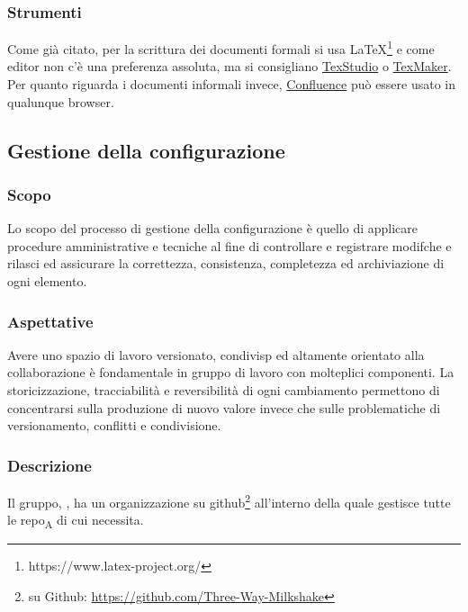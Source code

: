     \subsubsection{Strumenti}
    Come già citato, per la scrittura dei documenti formali si usa \LaTeX\footnote{https://www.latex-project.org/} e come editor non c'è una preferenza assoluta, ma si consigliano \href{http://www.texstudio.org/}{TexStudio} o \href{https://www.xm1math.net/texmaker/}{TexMaker}. Per quanto riguarda i documenti informali invece, \href{https://www.atlassian.com/software/confluence}{Confluence} può essere usato in qualunque browser.

\subsection{Gestione della configurazione}
    \subsubsection{Scopo}
        Lo scopo del processo di gestione della configurazione è quello di applicare procedure amministrative e tecniche al fine di controllare e registrare modifche e rilasci ed assicurare la correttezza, consistenza, completezza ed archiviazione di ogni elemento.
    \subsubsection{Aspettative}
        Avere uno spazio di lavoro versionato, condivisp ed altamente orientato alla collaborazione è fondamentale in gruppo di lavoro con molteplici componenti. La storicizzazione, tracciabilità e reversibilità di ogni cambiamento permettono di concentrarsi sulla produzione di nuovo valore invece che sulle problematiche di versionamento, conflitti e condivisione.
    \subsubsection{Descrizione}
        Il gruppo, \group, ha un organizzazione su github\footnote{\group su Github: \url{https://github.com/Three-Way-Milkshake}} all'interno della quale gestisce tutte le \acrshort{repo}\textsubscript{A} di cui necessita.
